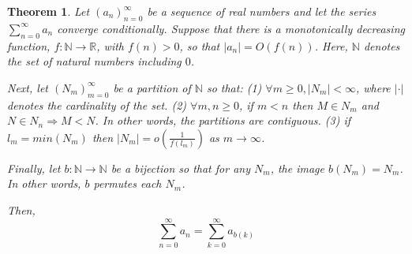 \documentclass{article}
\newtheorem{theorem}{Theorem}
\begin{document}
	\begin{theorem}
	Let $(a_n)_{n=0}^{\infty}$ be a sequence of real numbers and let the series $\sum_{n=0}^{\infty} a_n$ converge conditionally. 
	Suppose that there is a monotonically decreasing function, $f : \mathbb{N} \rightarrow \mathbb{R}$, with $f(n) > 0$, so that $\left| a_n \right| = O(f(n))$. Here, $\mathbb{N}$ denotes the set of natural numbers including $0$. \newline
	
	Next, let $\left( N_m \right)_{m=0}^{\infty}$ be a partition of $ \mathbb{N} $ so that: \newline
	(1) $\forall m \geq 0, \left| N_m \right| < \infty$, where $\left| \cdot \right|$ denotes the cardinality of the set. \newline
	(2) $\forall m, n \geq 0$, if $m < n$ then $M \in N_m$ and $N \in N_n \Rightarrow M < N $. In other words, the partitions are contiguous. \newline
	(3) if $l_m = min \left( N_m \right)$ then $ \left| N_m \right| = o( \frac{1}{f(l_m)} ) $ as $m \rightarrow \infty$. \newline
	
	Finally, let $b : \mathbb{N} \rightarrow \mathbb{N}$ be a bijection so that for any $N_m$, the image $b \left( N_m \right) = N_m$. In other words, $b$ permutes each $N_m$. \newline
	
	Then, $$ \sum_{n=0}^{\infty} a_n = \sum_{k=0}^{\infty} a_{b(k)} $$
	
	\end{theorem}

	\vspace{15px}
\end{document}
